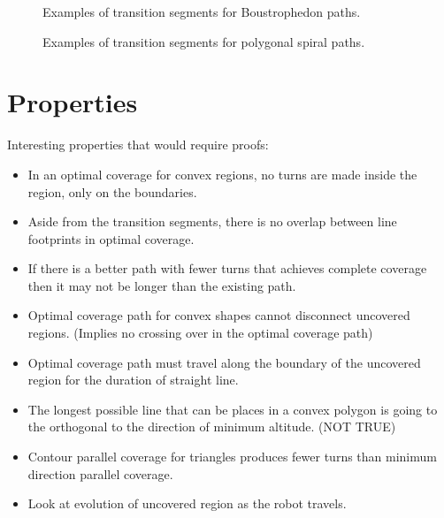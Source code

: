 \documentclass[../main.tex]{subfiles}
\begin{document}
\begin{figure}
	\centering
	

	\caption{Examples of transition segments for Boustrophedon paths.}
	\label{fig:boustrophedon_transition_types}
\end{figure}

\begin{figure}
	\centering
	

	\caption{Examples of transition segments for polygonal spiral paths.}
	\label{fig:polygonal_spiral_types}
\end{figure}



\section{Properties}
\label{sec:properties}

Interesting properties that would require proofs:
\begin{itemize}
	\item In an optimal coverage for convex regions, no turns are made inside the region, only on the boundaries.
	\item Aside from the transition segments, there is no overlap between line footprints in optimal coverage.
	\item If there is a better path with fewer turns that achieves complete coverage then it may not be longer than the existing path.
	\item Optimal coverage path for convex shapes cannot disconnect uncovered regions. (Implies no crossing over in the optimal coverage path)
	\item Optimal coverage path must travel along the boundary of the uncovered region for the duration of straight line.
	\item The longest possible line that can be places in a convex polygon is going to the orthogonal to the direction of minimum altitude. (NOT TRUE)
	\item Contour parallel coverage for triangles produces fewer turns than minimum direction parallel coverage.
	\item Look at evolution of uncovered region as the robot travels.
\end{itemize}
\end{document}
